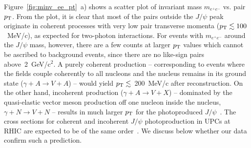 \documentclass[dvipdfm]{elsart}
\def\fig#1{{Figure~\ref{#1}}}
\providecommand{\jpsi}{J/\psi}
\begin{document}
\fig{fig:minv_ee_pt}~a) shows a scatter plot of invariant mass $m_{e^+e^-}$ 
vs. pair $p_{\rm T}$. From the plot, it is clear that most of the pairs outside the 
$\jpsi$ peak originate in coherent processes with very low pair transverse 
momenta ($p_{\rm T} \lesssim 100$~MeV/c), as expected for two-photon interactions. 
For events with $m_{e^+e^-}$ around the $\jpsi$ mass, however, there are a 
few counts at larger $p_{\rm T}$ values which cannot be ascribed to background 
events, since there are no like-sign pairs above~2~GeV/c$^2$. A purely 
coherent production -- corresponding to events where the fields couple 
coherently to all nucleons and the nucleus remains in its ground state 
($\gamma + A \rightarrow V + A$) -- would yield $p_{\rm T}\lesssim$~200~MeV/c after 
reconstruction. On the other hand, incoherent production ($\gamma + A 
\rightarrow V + X$) -- dominated by the quasi-elastic vector meson production 
off one nucleon inside the nucleus, $\gamma + N \rightarrow V + N$ -- results 
in much larger $p_{\rm T}$ for the photoproduced $\jpsi$~\cite{Strikman:2005ze}. 
The cross sections for coherent and incoherent $\jpsi$ photoproduction in 
UPCs at RHIC are expected to be of the same order~\cite{Strikman:2005ze}. We 
discuss below whether our data confirm such a prediction.
\end{document}
